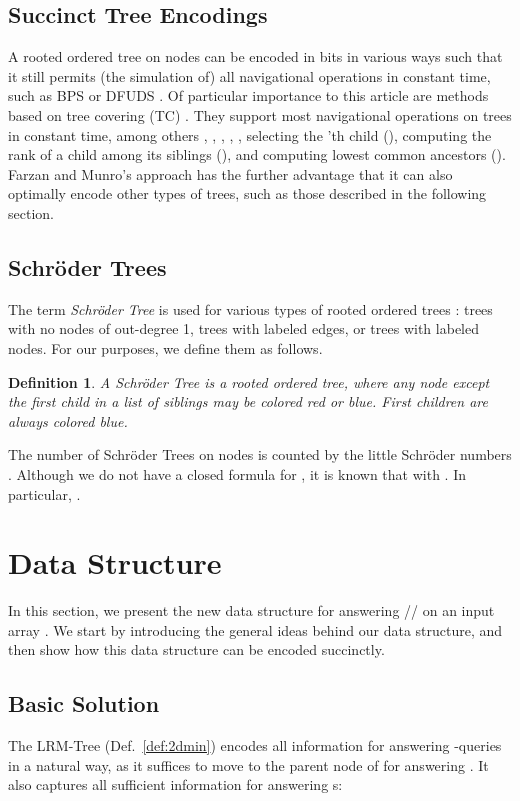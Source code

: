 \documentclass[11pt,onecolumn,final]{article} \usepackage{a4}
\theoremstyle{plain}
\newtheorem{definition}{Definition}
\theoremstyle{remark}
\begin{document}
\subsection{Succinct Tree Encodings}
\label{sect:succinct_trees}
A rooted ordered tree on  nodes can be encoded in  bits in various ways such that it still permits (the simulation of) all navigational operations in constant time, such as BPS \cite{munro01succinct} or DFUDS \cite{benoit05representing}. Of particular importance to this article are methods based on tree covering (TC) \cite{geary06succinct,he07succinct,farzan08uniform}. They support most navigational operations on trees in constant time, among others , , , , , selecting the 'th child (), computing the rank of a child among its siblings (), and computing lowest common ancestors (). Farzan and Munro's approach \cite{farzan08uniform} has the further advantage that it can also optimally encode other types of trees, such as those described in the following section.

\subsection{Schr\"oder Trees}
\label{sect:schroeder}
The term \emph{Schr\"oder Tree} is used for various types of rooted ordered trees \cite{stanley99enumerative}: trees with no nodes of out-degree 1, trees with labeled edges, or trees with labeled nodes. For our purposes, we define them as follows.

\begin{definition}
  A \emph{Schr\"oder Tree} is a rooted ordered tree, where any node except the first child in a list of siblings may be colored red or blue. First children are always colored blue.
\end{definition}

The number of Schr\"oder Trees on  nodes is counted by the little Schr\"oder numbers . Although we do not have a closed formula for , it is known \cite{merlini04waiting} that  with . In particular, .

\section{Data Structure}
\label{sect:main}
In this section, we present the new data structure for answering // on an input array . We start by introducing the general ideas behind our data structure, and then show how this data structure can be encoded succinctly.

\subsection{Basic Solution}
\label{sect:basic}
The LRM-Tree (Def.~\ref{def:2dmin}) encodes all information for answering -queries in a natural way, as it suffices to move to the parent node of  for answering . It also captures all sufficient information for answering s:
\end{document}
